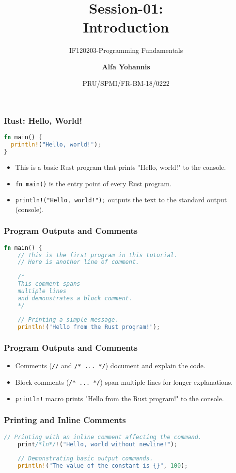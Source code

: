\documentclass[aspectratio=169, table]{beamer}
\subtitle{IF120203-Programming Fundamentals}
\title{\LARGE{Session-01:\\Introduction}
\vspace{20pt}}
\date[Serial]{\scriptsize {PRU/SPMI/FR-BM-18/0222}}
\author[Pradita]{\small{\textbf{Alfa Yohannis}}}
\begin{document}
\frame{\titlepage}

\begin{frame}[fragile]
\frametitle{Rust: Hello, World!}
\begin{lstlisting}[language=Rust]
fn main() {
  println!("Hello, world!");
}
\end{lstlisting}
\begin{itemize}
\item This is a basic Rust program that prints "Hello, world!" to the console.
\item \texttt{fn main()} is the entry point of every Rust program.
\item \texttt{println!("Hello, world!");} outputs the text to the standard output (console).
\end{itemize}
\end{frame}

\begin{frame}[fragile]
\frametitle{Program Outputs and Comments}
\begin{lstlisting}[language=Rust]
fn main() {
	// This is the first program in this tutorial.
	// Here is another line of comment.
	
	/* 
	This comment spans 
	multiple lines 
	and demonstrates a block comment.
	*/
	
	// Printing a simple message.
	println!("Hello from the Rust program!");
\end{lstlisting}
\end{frame}

\begin{frame}
\frametitle{Program Outputs and Comments}
\begin{itemize}
	\item Comments (\texttt{//} and \texttt{/* ... */}) document and explain the code.
	\item Block comments (\texttt{/* ... */}) span multiple lines for longer explanations.
	\item \texttt{println!} macro prints "Hello from the Rust program!" to the console.
\end{itemize}
\end{frame}

\begin{frame}[fragile]
\frametitle{Printing and Inline Comments}
\begin{lstlisting}[language=Rust]
	// Printing with an inline comment affecting the command.
	print/*ln*/!("Hello, world without newline!");
	
	// Demonstrating basic output commands.
	println!("The value of the constant is {}", 100);
\end{lstlisting}
\end{frame}
\end{document}
